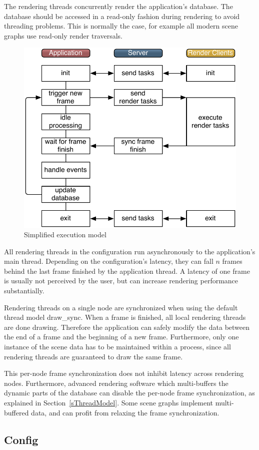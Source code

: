 \documentclass[10pt,a4]{scrartcl}
\newcommand{\sref}[1]{Section~\ref{#1}}
\begin{document}
The rendering threads concurrently render the application's
database. The data\-base should be accessed in a read-only fashion
during rendering to avoid threading problems. This is normally the case,
for example all modern scene graphs use read-only render traversals.

\begin{figure}
  \includegraphics[width=.618\textwidth]{images/model.pdf}
  {\caption{\small\label{fModel}Simplified execution model}}
\end{figure}
All rendering threads in the configuration run asynchronously to the
application's main thread. Depending on the configuration's latency,
they can fall $n$ frames behind the last frame finished by the
application thread. A latency of one frame is usually not perceived by
the user, but can increase rendering performance substantially.

Rendering threads on a single node are synchronized when using the
default thread model \textsf{draw\_sync}. When a frame is finished, all
local rendering threads are done drawing. Therefore the application can
safely modify the data between the end of a frame and the beginning of a
new frame. Furthermore, only one instance of the scene data has to be
maintained within a process, since all rendering threads are guaranteed
to draw the same frame.

This per-node frame synchronization does not inhibit latency across
rendering nodes. Furthermore, advanced rendering software which
multi-buffers the dynamic parts of the database can disable the per-node
frame synchronization, as explained in \sref{sThreadModel}. Some scene
graphs implement multi-buffered data, and can profit from relaxing the
frame synchronization.



\subsection{\label{sConfig}Config}
\end{document}
